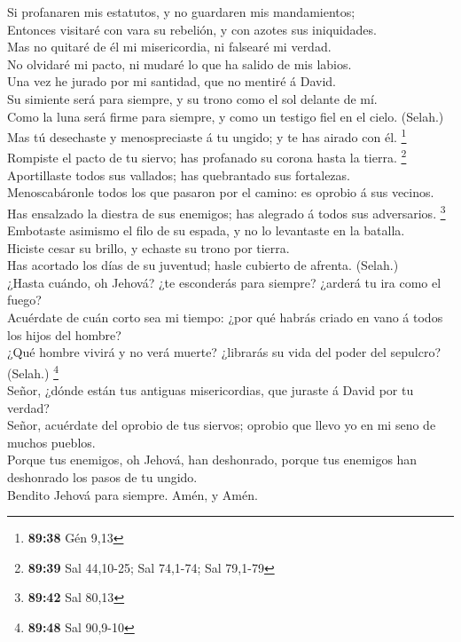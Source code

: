  Si profanaren mis estatutos, y no guardaren mis
mandamientos;\\
 Entonces visitaré con vara su rebelión, y con azotes sus
iniquidades.\\
 Mas no quitaré de él mi misericordia, ni falsearé mi
verdad.\\
 No olvidaré mi pacto, ni mudaré lo que ha salido de mis
labios.\\
 Una vez he jurado por mi santidad, que no mentiré á
David.\\
 Su simiente será para siempre, y su trono como el sol
delante de mí.\\
 Como la luna será firme para siempre, y como un testigo
fiel en el cielo. (Selah.)\\
 Mas tú desechaste y menospreciaste á tu ungido; y te has
airado con él. \footnote{\textbf{89:38} Gén 9,13}\\
 Rompiste el pacto de tu siervo; has profanado su corona
hasta la tierra. \footnote{\textbf{89:39} Sal 44,10-25; Sal 74,1-74; Sal
  79,1-79}\\
 Aportillaste todos sus vallados; has quebrantado sus
fortalezas.\\
 Menoscabáronle todos los que pasaron por el camino: es
oprobio á sus vecinos.\\
 Has ensalzado la diestra de sus enemigos; has alegrado á
todos sus adversarios. \footnote{\textbf{89:42} Sal 80,13}\\
 Embotaste asimismo el filo de su espada, y no lo
levantaste en la batalla.\\
 Hiciste cesar su brillo, y echaste su trono por tierra.\\
 Has acortado los días de su juventud; hasle cubierto de
afrenta. (Selah.)\\
 ¿Hasta cuándo, oh Jehová? ¿te esconderás para siempre?
¿arderá tu ira como el fuego?\\
 Acuérdate de cuán corto sea mi tiempo: ¿por qué habrás
criado en vano á todos los hijos del hombre?\\
 ¿Qué hombre vivirá y no verá muerte? ¿librarás su vida del
poder del sepulcro? (Selah.) \footnote{\textbf{89:48} Sal 90,9-10}\\
 Señor, ¿dónde están tus antiguas misericordias, que
juraste á David por tu verdad?\\
 Señor, acuérdate del oprobio de tus siervos; oprobio que
llevo yo en mi seno de muchos pueblos.\\
 Porque tus enemigos, oh Jehová, han deshonrado, porque tus
enemigos han deshonrado los pasos de tu ungido.\\
 Bendito Jehová para siempre. Amén, y Amén.

